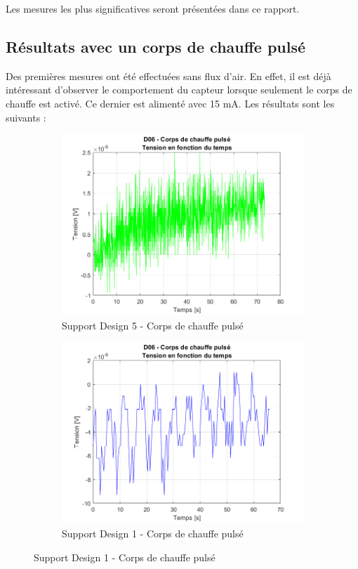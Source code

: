 Les mesures les plus significatives seront présentées dans ce rapport. \\

\subsection{Résultats avec un corps de chauffe pulsé}
Des premières mesures ont été effectuées sans flux d'air. En effet, il est déjà intéressant d'observer le comportement du capteur
lorsque seulement le corps de chauffe est activé. Ce dernier est alimenté avec 15 mA. Les résultats sont les suivants :
\begin{figure}[H]
    \hspace{-0.5cm}
    \begin{subfigure}[b]{0.45\textwidth}
        \includegraphics[scale = 0.45]{assets/figures/D06_corps_chauffe_pulse_green.png}
        \caption{Support Design 5 - Corps de chauffe pulsé}
        \label{fig:chauffe_pulse_g}
    \end{subfigure}
    \begin{subfigure}[b]{0.45\textwidth}
        \includegraphics[scale = 0.45]{assets/figures/D06_corps_chauffe_pulse_blue.png}
        \caption{Support Design 1 - Corps de chauffe pulsé}
        \label{fig:chauffe_pulse_b}
    \end{subfigure}
\end{figure}

